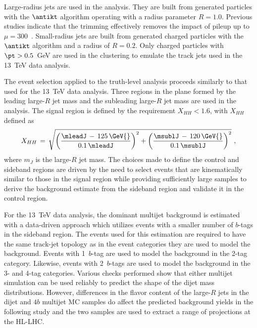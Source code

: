 Large-radius jets are used in the analysis. They are built from generated particles with the $\antikt$ algorithm
operating with a radius parameter $R = 1.0$. Previous studies indicate that the trimming 
effectively removes the impact of pileup up to $\mu = 300$~\cite{JetSubstructureECFA2014}.
Small-radius jets are built from generated charged particles
with the $\antikt$ algorithm and a radius of $R=0.2$. Only charged particles with $\pt > 0.5$~GeV
are used in the clustering to emulate the track jets used in the 13~TeV data analysis.

The event selection applied to the truth-level analysis
proceeds similarly to that used for the 13~TeV data analysis.
Three regions in the plane formed by the leading large-$R$ jet mass and the
subleading large-$R$ jet mass are used in the analysis.
The signal region is defined by the requirement $X_{HH} < 1.6$, with $X_{HH}$ defined as
\begin{equation}
X_{HH}\,=\,\sqrt{\left(\frac{\mleadJ\,-\,125\,\GeV{}}{0.1\,\mleadJ}\right)^2 + \left(\frac{\msublJ\,-\,120\,\GeV{}}{0.1\,\msublJ}\right)^2}~,
\label{eq:XHH}
\end{equation}
where $m_{J}$ is the large-$R$ jet mass.
The choices made to define the control and sideband regions are driven by the
need to select events that are kinematically similar to those in the signal region
while providing sufficiently large samples to derive the background estimate from
the sideband region and validate it in the control region.

For the 13~TeV data analysis, the dominant multijet background is estimated with
a data-driven approach which utilizes events with a smaller number of $b$-tags in the sideband region.
The events used for this estimation are required to have the same track-jet topology 
as in the event categories they are used to model the background. 
Events with 1~$b$-tag are used to model the background in the 2-tag category. 
Likewise, events with 2~$b$-tags are used to model the background in the 3- and 4-tag categories.
Various checks performed show that either multijet simulation can be used reliably to predict the shape
of the dijet mass distributions. However, differences in the flavor content of the large-$R$ jets 
in the dijet and $4b$ multijet MC samples do affect the predicted background yields in
the following study and the two samples are used to extract a range of projections at the HL-LHC.

